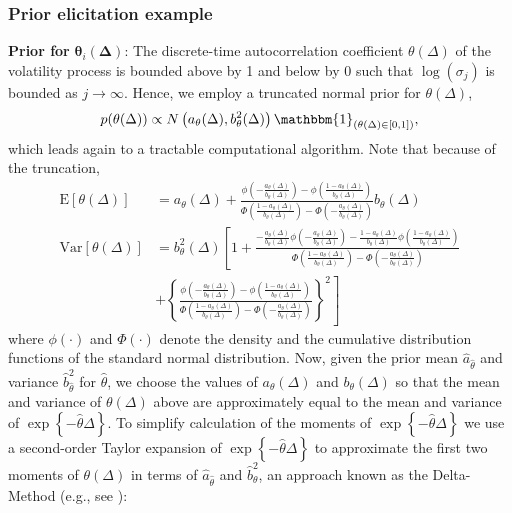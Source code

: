\documentclass{beamer}
\newcommand{\hb}{\hat{b}}
\newcommand{\ha}{\hat{a}}
\newcommand{\htheta}{\hat{\theta}}
\newcommand{\E}[1]{\mbox{E}\left[#1\right]}
\newcommand{\Var}[1]{\mbox{Var}\left[#1\right]}
\newcommand{\Indicator}[1]{\mathbbm{1}_{ \left( #1 \right) } }
\begin{document}
\begin{frame}[allowframebreaks]
  \frametitle{Prior elicitation example}

  \textbf{Prior for } $\boldsymbol{\theta}_i(\boldsymbol{\Delta})$: The discrete-time autocorrelation coefficient $\theta(\Delta)$ of the volatility process is bounded above by 1 and below by 0 such that $\log(\sigma_j)$ is bounded as $j \to \infty$.  Hence, we employ a truncated normal prior for $\theta(\Delta)$,
$$
p(\theta(\Delta)) \propto N\left(a_{\theta}(\Delta), b^2_{\theta}(\Delta) \right) \Indicator{\theta(\Delta) \in [0,1]},
$$
which leads again to a tractable computational algorithm. Note that because of the truncation,
\begin{align}
\E{\theta(\Delta)} &= a_{\theta}(\Delta) + \frac{ \phi\left( -\frac{a_{\theta}(\Delta)}{b_{\theta}(\Delta)} \right) - \phi\left(\frac{1- a_{\theta}(\Delta)}{b_{\theta}(\Delta)} \right)}{\Phi\left( \frac{1- a_{\theta}(\Delta) }{b_{\theta}(\Delta)} \right) - \Phi\left( -\frac{a_{\theta}(\Delta)}{b_{\theta}(\Delta)} \right)}  b_{\theta}(\Delta)  \label{eq:meantheta1} \\
\Var{\theta(\Delta)} &= b^2_{\theta}(\Delta)  \left[ 1 + \frac{ -\frac{a_{\theta}(\Delta)}{b_{\theta}(\Delta)}\phi\left( -\frac{a_{\theta}(\Delta)}{b_{\theta}(\Delta)} \right) - \frac{1- a_{\theta}(\Delta)}{b_{\theta}(\Delta)}\phi\left(\frac{1- a_{\theta}(\Delta)}{b_{\theta}(\Delta)} \right)}{\Phi\left( \frac{1- a_{\theta}(\Delta) }{b_{\theta}(\Delta)} \right) - \Phi\left( -\frac{a_{\theta}(\Delta)}{b_{\theta}(\Delta)} \right)}   \right.  \nonumber \\ &      \left.
%
+\left\{ \frac{ \phi\left( -\frac{a_{\theta}(\Delta)}{b_{\theta}(\Delta)} \right) - \phi\left(\frac{1- a_{\theta}(\Delta)}{b_{\theta}(\Delta)} \right)}{\Phi\left( \frac{1- a_{\theta}(\Delta) }{b_{\theta}(\Delta)} \right) - \Phi\left( -\frac{a_{\theta}(\Delta)}{b_{\theta}(\Delta)} \right)} \right\}^2    \label{eq:vartheta1}
\right]
\end{align}
where $\phi(\cdot)$ and $\Phi(\cdot)$ denote the density and the cumulative distribution functions of the standard normal distribution.  Now, given the prior mean $\ha_{\htheta}$ and variance $\hb^2_{\htheta}$ for $\htheta$, we choose the values of $a_{\theta}(\Delta)$ and $b_{\theta}(\Delta)$ so that the mean and variance of $\theta(\Delta)$ above are approximately equal to the mean and variance of $\exp\left\{ -\htheta \Delta \right\}$. To simplify calculation of the moments of $\exp\left\{ -\htheta \Delta \right\}$ we use a second-order Taylor expansion of $\exp\left\{ -\hat{\theta} \Delta \right\}$ to approximate the first two moments of $\theta(\Delta)$ in terms of $\ha_{\htheta}$ and $\hb^2_{\theta}$, an approach known as the Delta-Method (e.g., see \cite{casella2002statistical}):

\end{frame}
\end{document}
